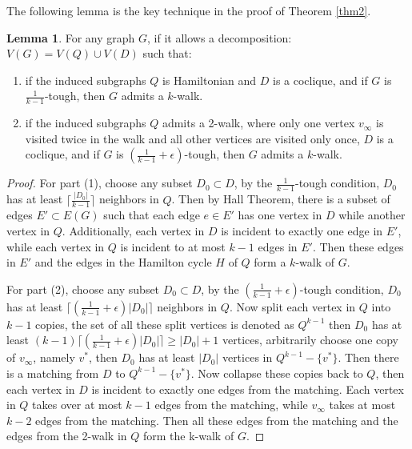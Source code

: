 \documentclass{amsart}
\theoremstyle{definition}
\newtheorem{lemma}{Lemma}
\begin{document}
The following lemma is the key technique in the proof of Theorem \ref{thm2}.

\begin{lemma}\label{addtec}
For any graph $G$, if it allows a decomposition: $V(G)=V(Q)\cup V(D)$ such that:

\begin{enumerate} 
\item if the induced subgraphs $Q$ is Hamiltonian and $D$ is a coclique, and if $G$ is $\frac{1}{k-1}$-tough, then $G$ admits a $k$-walk.
\item if the induced subgraphs $Q$ admits a 2-walk, where only one vertex $v_{\infty}$ is visited twice in the walk and all other vertices are visited only once, $D$ is a coclique, and if $G$ is $(\frac{1}{k-1}+\epsilon)$-tough, then $G$ admits a $k$-walk.

\end{enumerate}
\end{lemma}

\begin{proof}
For part (1), choose any subset $D_0\subset D$, by the $\frac{1}{k-1}$-tough condition, $D_0$ has at least $\lceil\frac{|D_0|}{k-1}\rceil$ neighbors in $Q$. Then by Hall Theorem, there is a subset of edges $E'\subset E(G)$ such that each edge $e\in E'$ has one vertex in $D$ while another vertex in $Q$. Additionally, each vertex in $D$ is incident to exactly one edge in $E'$, while each vertex in $Q$ is incident to at most $k-1$ edges in $E'$.
Then these edges in $E'$ and the edges in the Hamilton cycle $H$ of $Q$ form a $k$-walk of $G$.

For part (2), choose any subset $D_0\subset D$, by the $(\frac{1}{k-1}+\epsilon)$-tough condition, $D_0$ has at least $\lceil(\frac{1}{k-1}+\epsilon)|D_0|\rceil$ neighbors in $Q$. Now split each vertex in $Q$ into $k-1$ copies, the set of all these split vertices is denoted as $Q^{k-1}$ then $D_0$ has at least $(k-1)\lceil(\frac{1}{k-1}+\epsilon)|D_0|\rceil\ge|D_0|+1$ vertices, arbitrarily choose one copy of $v_{\infty}$, namely $v^*$, then $D_0$ has at least $|D_0|$ vertices in $Q^{k-1}-\{v^*\}$. Then there is a matching from $D$ to $Q^{k-1}-\{v^*\}$. Now collapse these copies back to $Q$, then each vertex in $D$ is incident to exactly one edges from the matching. Each vertex in $Q$ takes over at most $k-1$ edges from the matching, while $v_{\infty}$ takes at most $k-2$ edges from the matching. Then all these edges from the matching and the edges from the 2-walk in $Q$ form the k-walk of $G$.
\end{proof}
\end{document}
